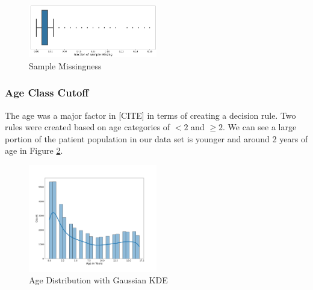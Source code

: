 \documentclass[11pt]{amsart}
\begin{document}
\begin{figure}
	\centering
	\includegraphics[width=0.5\textwidth]{sample_missingness.png}
	\caption{Sample Missingness}\label{fig:sample_missingness}
\end{figure}
\FloatBarrier

\subsubsection{Age Class Cutoff}

The age was a major factor in [CITE] in terms of creating a decision rule. Two rules were created based on age categories of $< 2$ and $\geq 2$. We can see a large portion of the patient population in our data set is younger and around 2 years of age in Figure \ref{fig:age_dist}.
\FloatBarrier
\begin{figure}
	\centering
	\includegraphics[width=0.5\textwidth]{age_dist.png}
	\caption{Age Distribution with Gaussian KDE}\label{fig:age_dist}
\end{figure}
\FloatBarrier
\end{document}

